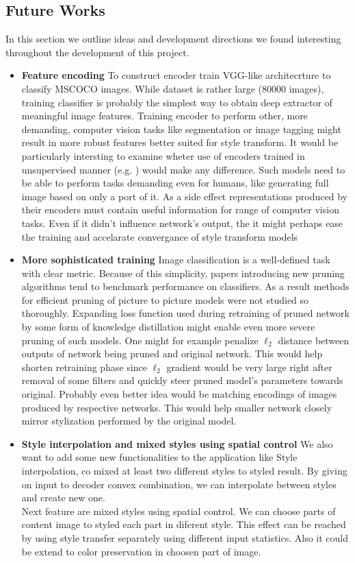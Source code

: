 \documentclass[../Main.tex]{subfiles}
\begin{document}
\subsection{Future Works}
In this section we outline ideas and development directions we found interesting
throughout the development of this project.
\begin{itemize}
\item \textbf{Feature encoding}
    To construct encoder \cite{Li2018} train VGG-like architecrture to classify 
    MSCOCO images. While dataset is rather large (80000 images), training classifier
    is probably the simplest way to obtain deep extractor of meaningful image features.
    Training encoder to perform other, more demanding, computer vision tasks like 
    segmentation or image tagging might result in more robust features better suited
    for style transform. It would be particularly intersting to examine wheter use of encoders
    trained in unsupervised manner (e.g. \cite{CPC, CPCv2}) would make any difference.
    Such models need to be able to perform tasks demanding even for humans, like generating
    full image based on only a port of it. As a side effect representations produced by their
    encoders must contain useful information for range of computer vision tasks.
    Even if it didn't influence network's output, the it might perhaps ease the training
    and accelarate convergance of style transform models
\item \textbf{More sophisticated training}
    Image classification is a well-defined task with clear metric.
    Because of this simplicity, papers introducing new pruning algorithms tend to 
    benchmark performance on classifiers. As a result methods for efficient pruning of
    picture to picture models were not studied so thoroughly. Expanding loss function used during
    retraining of pruned network by some form of knowledge distillation might enable
    even more severe pruning of such models. One might for example penalize $\ell_2$
    distance between outputs of network being pruned and original network.
    This would help shorten retraining phase since $\ell_2$ gradient
    would be very large right after removal of some filters and quickly steer pruned
    model's parameters towards original. Probably even better idea would be matching
    encodings of images produced by respective networks. This would help
    smaller network closely mirror stylization performed by the original model.
\item \textbf{Style interpolation and mixed styles using spatial control}
    We also want to add some new functionalities to the application like Style interpolation, co mixed at least two different styles to styled result. By giving on input to decoder convex combination, we can interpolate between styles and create new one. \\
    Next feature are mixed styles using spatial control. We can choose parts of content image to styled each part in diferent style. This effect can be reached by using style transfer separately using different input statistics. Also it could be extend to color preservation in choosen part of image.
\end{itemize}

\biblio %
\end{document}
